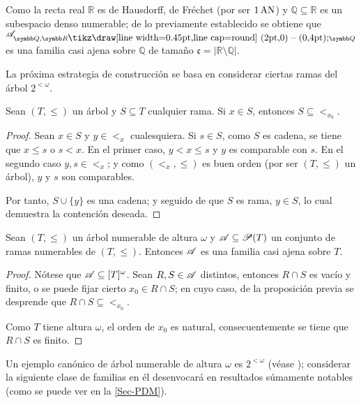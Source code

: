 	Como la recta real $\mathbb{R}$ es de Hausdorff, de Fréchet (por ser $1\operatorname{AN}$) y $\mathbb{Q} \subseteq \mathbb{R}$ es un subespacio denso numerable; de lo previamente establecido se obtiene que $\ms{A}_{\mathbb{Q},\mathbb{R}\setminus \mathbb{Q}}$ es una familia casi ajena sobre $\mathbb{Q}$ de tamaño $\mathfrak{c}=|\mathbb{R} \setminus \mathbb{Q}|$.
	
	La próxima estrategia de construcción se basa en considerar ciertas ramas del árbol $2^{<\omega}$.

	\begin{lema}
		Sean $(T,\leq)$ un árbol y $S \subseteq T$ cualquier rama. Si $x \in S$, entonces $S \subseteq <_{x_0}$.
	\end{lema}
	\begin{proof}
		Sean $x \in S$ y $y \in <_{x}$ cualesquiera. Si $s \in S$, como $S$ es cadena, se tiene que $x \leq s$ o $s < x$. En el primer caso, $y<x\leq s$ y $y$ es comparable con $s$. En el segundo caso $y,s \in <_{x}$; y como $(<_{x},\leq)$ es buen orden (por ser $(T,\leq)$ un árbol), $y$ y $s$ son comparables.

		Por tanto, $S \cup \{y\}$ es una cadena; y seguido de que $S$ es rama, $y \in S$, lo cual demuestra la contención deseada.
	\end{proof}

	\begin{proposicion}
		Sean $(T,\leq)$ un árbol numerable de altura $\omega$ y $\mathscr{A} \subseteq \mathscr{P}(T)$ un conjunto de ramas numerables de $(T,\leq)$. Entonces $\mathscr{A}$ es una familia casi ajena sobre $T$.
	\end{proposicion}
	
	\begin{proof}
		Nótese que $\mathscr{A} \subseteq [T]^\omega$. Sean $R,S \in \mathscr{A}$ distintos, entonces $R \cap S$ es vacío y finito, o se puede fijar cierto $x_0 \in R \cap S$; en cuyo caso, de la proposición previa se desprende que $R \cap S \subseteq <_{x_0}$.
		
		Como $T$ tiene altura $\omega$, el orden de $x_0$ es natural, consecuentemente se tiene que $R \cap S$ es finito. 
	\end{proof}

	Un ejemplo canónico de árbol numerable de altura $\omega$ es $2^{<\omega}$ (véase \pageref{arbol-2Ramas}); considerar la siguiente clase de familias en él desenvocará en resultados súmamente notables (como se puede ver en la \autoref{Sec-PDM}).

